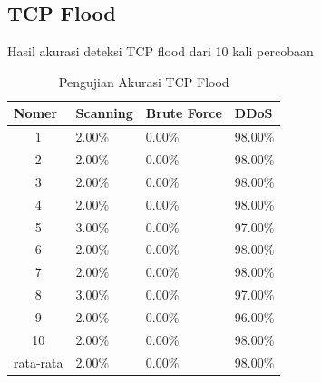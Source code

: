 \subsection{TCP Flood}
Hasil akurasi deteksi TCP flood dari 10 kali percobaan
\begin{table}[H]
	\centering
	\caption{Pengujian Akurasi TCP Flood}
	\label{Pengujian Akurasi TCP Flood}
	\begin{tabular}{|c|l|l|l|}
		\hline
		\multicolumn{1}{|l|}{Nomer}     & Scanning & Brute Force & DDoS    \\ \hline
		1                               & 2.00\%   & 0.00\%      & 98.00\% \\ \hline
		2                               & 2.00\%   & 0.00\%      & 98.00\% \\ \hline
		3                               & 2.00\%   & 0.00\%      & 98.00\% \\ \hline
		4                               & 2.00\%   & 0.00\%      & 98.00\% \\ \hline
		5                               & 3.00\%   & 0.00\%      & 97.00\% \\ \hline
		6                               & 2.00\%   & 0.00\%      & 98.00\% \\ \hline
		7                               & 2.00\%   & 0.00\%      & 98.00\% \\ \hline
		8                               & 3.00\%   & 0.00\%      & 97.00\% \\ \hline
		9                               & 2.00\%   & 0.00\%      & 96.00\% \\ \hline
		10                              & 2.00\%   & 0.00\%      & 98.00\% \\ \hline
		\multicolumn{1}{|l|}{rata-rata} & 2.00\%   & 0.00\%      & 98.00\% \\ \hline
	\end{tabular}
\end{table}

